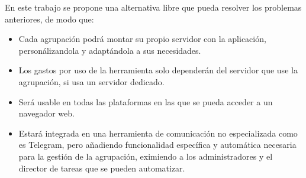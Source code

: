 En este trabajo se propone una alternativa libre que pueda resolver los problemas anteriores, de modo que:

\begin{itemize}
    \item Cada agrupación podrá montar su propio servidor con la aplicación, personálizandola y adaptándola a sus necesidades.
    \item Los gastos por uso de la herramienta solo dependerán del servidor que use la agrupación, si usa un servidor dedicado.
    \item Será usable en todas las plataformas en las que se pueda acceder a un navegador web.
    \item Estará integrada en una herramienta de comunicación no especializada como es Telegram, pero añadiendo funcionalidad específica y automática necesaria para la gestión de la agrupación, eximiendo a los administradores y el director de tareas que se pueden automatizar.
\end{itemize}

